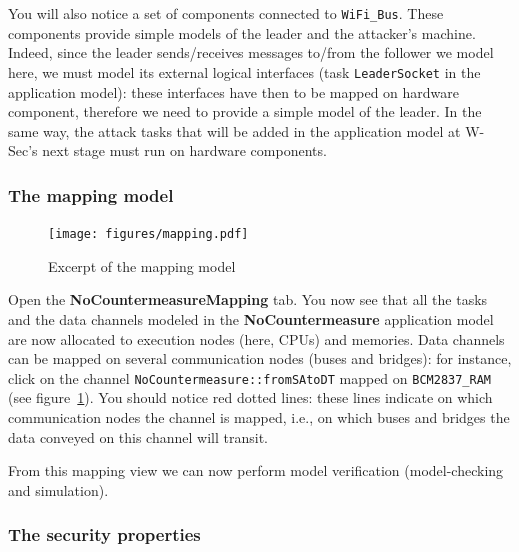 \documentclass{article}
\begin{document}
You will also notice a set of components connected to \texttt{WiFi\_Bus}. These components provide simple models of the leader and the attacker's machine. Indeed, since the leader sends/receives messages to/from the follower we model here, we must model its external logical interfaces (task \texttt{LeaderSocket} in the application model): these interfaces have then to be mapped on hardware component, therefore we need to provide a simple model of the leader. In the same way, the attack tasks that will be added in the application model at W-Sec's next stage must run on hardware components.

\subsubsection{The mapping model}

\begin{figure}
	\centering
	\texttt{[image: figures/mapping.pdf]}
	\caption{Excerpt of the mapping model}
	\label{fig:rovermapping}
\end{figure}
Open the \textbf{NoCountermeasureMapping} tab. You now see that all the tasks and the data channels modeled in the \textbf{NoCountermeasure} application model are now allocated to execution nodes (here, CPUs) and memories. Data channels can be mapped on several communication nodes (buses and bridges): for instance, click on the channel \texttt{NoCountermeasure::fromSAtoDT} mapped on \texttt{BCM2837\_RAM} (see figure~\ref{fig:rovermapping}). You should notice red dotted lines: these lines indicate on which communication nodes the channel is mapped, i.e., on which buses and bridges the data conveyed on this channel will transit.

From this mapping view we can now perform model verification (model-checking and simulation).

\subsubsection{The security properties}
\end{document}
